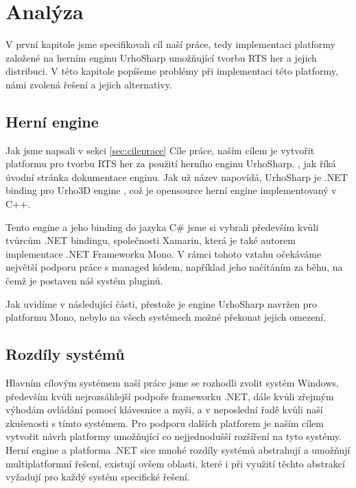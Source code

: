 \chapter{Analýza}
V první kapitole jsme specifikovali cíl naší práce, tedy implementaci platformy založené na herním enginu UrhoSharp umožňující tvorbu RTS her a jejich distribuci. V této kapitole popíšeme problémy při implementaci této platformy, námi zvolená řešení a jejich alternativy.

\section{Herní engine}
Jak jsme napsali v sekci \ref{sec:cileprace} Cíle práce, naším cílem je vytvořit platformu pro tvorbu RTS her za použití herního enginu UrhoSharp. \textit{ } \citep{site:urhosharp}, jak říká úvodní stránka dokumentace enginu. Jak už název napovídá, UrhoSharp je .NET binding pro Urho3D engine \citep{site:urho3D}, což je opensource herní engine implementovaný v C++.

Tento engine a jeho binding do jazyka C\# jsme si vybrali především kvůli tvůrcům .NET bindingu, společnosti Xamarin, která je také autorem implementace .NET Frameworku Mono. V rámci tohoto vztahu očekáváme největší podporu práce s managed kódem, například jeho načítáním za běhu, na čemž je postaven náš systém pluginů. 

Jak uvidíme v následující části, přestože je engine UrhoSharp navržen pro platformu Mono, nebylo na všech systémech možné překonat jejich omezení.

\section{Rozdíly systémů}
Hlavním cílovým systémem naší práce jsme se rozhodli zvolit systém Windows, především kvůli nejrozsáhlejší podpoře frameworku .NET, dále kvůli zřejmým výhodám ovládání pomocí klávesnice a myši, a v neposlední řadě kvůli naší zkušenosti s tímto systémem. Pro podporu dalších platforem je naším cílem vytvořit návrh platformy umožňující co nejjednodušší rozšíření na tyto systémy. Herní engine a platforma .NET sice mnohé rozdíly systémů abstrahují a umožňují multiplatformní řešení, existují ovšem oblasti, které i při využití těchto abstrakcí vyžadují pro každý systém specifické řešení.  

